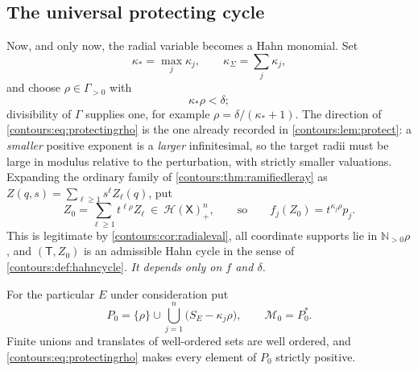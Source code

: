 \documentclass[11pt,letterpaper]{article}
\theoremstyle{definition}
\theoremstyle{remark}
\newcommand{\N}{\mathbb N}\newcommand{\Z}{\mathbb Z}\newcommand{\DD}{\mathbb D}
\newcommand{\HH}{\mathcal H}\newcommand{\A}{\mathscr A}\newcommand{\OO}{\mathcal O}
\numberwithin{equation}{section}
\begin{document}
\subsection{The universal protecting cycle}
\label{contours:subsec:protecting}
Now, and only now, the radial variable becomes a Hahn monomial. Set
\begin{equation}\label{contours:eq:kappastar}
  \kappa_*=\max_j\kappa_j,\qquad \kappa_\Sigma=\sum_j\kappa_j,
\end{equation}
and choose $\rho\in\Gamma_{>0}$ with
\begin{equation}\label{contours:eq:protectingrho}
  \kappa_*\rho<\delta ;
\end{equation}
divisibility of $\Gamma$ supplies one, for example $\rho=\delta/(\kappa_*+1)$.
The direction of \eqref{contours:eq:protectingrho} is the one already recorded
in \cref{contours:lem:protect}: a \emph{smaller} positive exponent is a
\emph{larger} infinitesimal, so the target radii must be large in modulus
relative to the perturbation, with strictly smaller valuations. Expanding the ordinary family of
\cref{contours:thm:ramifiedleray} as $Z(q,s)=\sum_{\ell\ge1}s^\ell Z_\ell(q)$,
put
\begin{equation}\label{contours:eq:Zzero}
  Z_0=\sum_{\ell\ge1}t^{\ell\rho}Z_\ell
  \ \in\ \HH(\mathsf X)_+^n ,
  \qquad\text{so}\qquad
  f_j(Z_0)=t^{\kappa_j\rho}p_j .
\end{equation}
This is legitimate by \cref{contours:cor:radialeval}, all coordinate supports lie
in $\N_{>0}\rho$, and $(\mathsf T,Z_0)$ is an admissible Hahn cycle in the sense
of \cref{contours:def:hahncycle}. \emph{It depends only on $f$ and $\delta$.}

For the particular $E$ under consideration put
\begin{equation}\label{contours:eq:Pzero}
  P_0=\{\rho\}\cup\bigcup_{j=1}^n\bigl(S_E-\kappa_j\rho\bigr),
  \qquad \mathcal M_0=P_0^* .
\end{equation}
Finite unions and translates of well-ordered sets are well ordered, and
\eqref{contours:eq:protectingrho} makes every element of $P_0$ strictly
positive.
\end{document}
